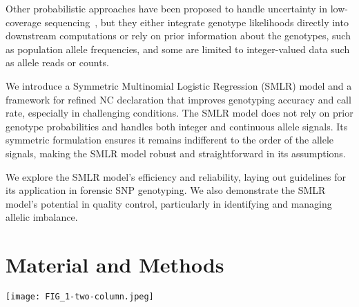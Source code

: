 \documentclass[preprint,5p,times,11pt]{elsarticle}
\begin{document}
Other probabilistic approaches have been proposed to handle uncertainty in low-coverage sequencing~\cite{mostad}, but they either integrate genotype likelihoods directly into downstream computations or rely on prior information about the genotypes, such as population allele frequencies, and some are limited to integer-valued data such as allele reads or counts.

We introduce a Symmetric Multinomial Logistic Regression (SMLR) model and a framework for refined NC declaration that improves genotyping accuracy and call rate, especially in challenging conditions.
The SMLR model does not rely on prior genotype probabilities and handles both integer and continuous allele signals.
Its symmetric formulation ensures it remains indifferent to the order of the allele signals, making the SMLR model robust and straightforward in its assumptions.

We explore the SMLR model's efficiency and reliability, laying out guidelines for its application in forensic SNP genotyping.
We also demonstrate the SMLR model's potential in quality control, particularly in identifying and managing allelic imbalance.



\section{Material and Methods}
\begin{figure*}
\centering
\texttt{[image: FIG\_1-two-column.jpeg]}
\caption{
Genotype predictions for the examinations of \SI{31.25}{\pg} DNA.\\
Each plot displays 1,931~SNP observations classified using the genotyping methods:
HID SNP Genotyper Plugin~(HSG), Enforcing the Quality Checks~(EQC), and Symmetric Multinomial Logistic Regression~(SMLR).
A dot represents a set of read counts $(s_1, s_2)$ for an SNP.
It is coloured by the true genotype: red for heterozygous and blue or yellow for homozygous.
Failed genotype predictions are indicated by red crosses for wrong calls and black pluses for no-calls.
In the EQC plot~(middle), the grey areas show where the HSG is guaranteed to flag for allelic imbalance.
In the SMLR plot (right), the solid lines show the decision boundaries of the SMLR model with an intercept fitted to square-root transformed allele signals. The grey area marks the no-call zone where genotype probabilities fall short of the threshold $q = 0.9937$ (a value chosen for illustrative purpose).
Outside the grey area, the predicted genotype has $P(G \mid s_1, s_2) \geq q$.
}
\label{fig:methods}
\end{figure*}
\end{document}
